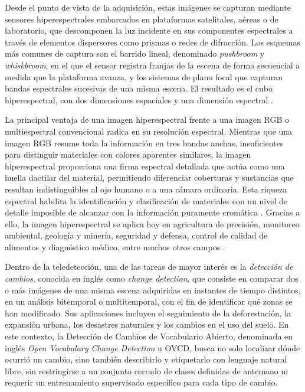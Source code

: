\documentclass[12pt,onecolumn]{IEEEtran}
\begin{document}
Desde el punto de vista de la adquisición, estas imágenes se capturan mediante sensores hiperespectrales embarcados en plataformas satelitales, aéreas o de laboratorio, que descomponen la luz incidente en sus componentes espectrales a través de elementos dispersores como prismas o redes de difracción. Los esquemas más comunes de captura son el barrido lineal, denominado \textit{pushbroom} y \textit{whiskbroom}, en el que el sensor registra franjas de la escena de forma secuencial a medida que la plataforma avanza, y los sistemas de plano focal que capturan bandas espectrales sucesivas de una misma escena. El resultado es el cubo hiperespectral, con dos dimensiones espaciales y una dimensión espectral \cite{bhargava2024hyperspectral}.

La principal ventaja de una imagen hiperespectral frente a una imagen RGB o multiespectral convencional radica en su resolución espectral. Mientras que una imagen RGB resume toda la información en tres bandas anchas, insuficientes para distinguir materiales con colores aparentes similares, la imagen hiperespectral proporciona una firma espectral detallada que actúa como una huella dactilar del material, permitiendo diferenciar coberturas y sustancias que resultan indistinguibles al ojo humano o a una cámara ordinaria. Esta riqueza espectral habilita la identificación y clasificación de materiales con un nivel de detalle imposible de alcanzar con la información puramente cromática \cite{bhargava2024hyperspectral}. Gracias a ello, la imagen hiperespectral se aplica hoy en agricultura de precisión, monitoreo ambiental, geología y minería, seguridad y defensa, control de calidad de alimentos y diagnóstico médico, entre muchos otros campos \cite{bhargava2024hyperspectral}.

Dentro de la teledetección, una de las tareas de mayor interés es la \textit{detección de cambios}, conocida en inglés como \textit{change detection}, que consiste en comparar dos o más imágenes de una misma escena adquiridas en instantes de tiempo distintos, en un análisis bitemporal o multitemporal, con el fin de identificar qué zonas se han modificado. Sus aplicaciones incluyen el seguimiento de la deforestación, la expansión urbana, los desastres naturales y los cambios en el uso del suelo. En este contexto, la Detección de Cambios de Vocabulario Abierto, denominada en inglés \textit{Open Vocabulary Change Detection} u OVCD, busca no solo localizar dónde ocurrió un cambio, sino también describirlo y etiquetarlo con lenguaje natural libre, sin restringirse a un conjunto cerrado de clases definidas de antemano ni requerir un entrenamiento supervisado específico para cada tipo de cambio.
\end{document}
